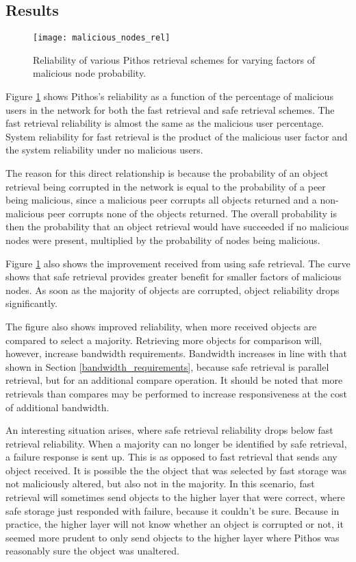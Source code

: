 \subsection{Results}
\begin{figure}[htbp]
 \centering
 \texttt{[image: malicious\_nodes\_rel]}
 \caption{Reliability of various Pithos retrieval schemes for varying factors of malicious node probability.}
 \label{fig_malicious_nodes_rel}
\end{figure}
%
Figure \ref{fig_malicious_nodes_rel} shows Pithos's reliability as a function of the percentage of malicious users in the network for both the fast retrieval and safe retrieval schemes. The fast retrieval reliability is almost the same as the malicious user percentage. System reliability for fast retrieval is the product of the malicious user factor and the system reliability under no malicious users.

The reason for this direct relationship is because the probability of an object retrieval being corrupted in the network is equal to the probability of a peer being malicious, since a malicious peer corrupts all objects returned and a non-malicious peer corrupts none of the objects returned. The overall probability is then the probability that an object retrieval would have succeeded if no malicious nodes were present, multiplied by the probability of nodes being malicious.

Figure \ref{fig_malicious_nodes_rel} also shows the improvement received from using safe retrieval. The curve shows that safe retrieval provides greater benefit for smaller factors of malicious nodes. As soon as the majority of objects are corrupted, object reliability drops significantly.

The figure also shows improved reliability, when more received objects are compared to select a majority. Retrieving more objects for comparison will, however, increase bandwidth requirements. Bandwidth increases in line with that shown in Section \ref{bandwidth_requirements}, because safe retrieval is parallel retrieval, but for an additional compare operation. It should be noted that more retrievals than compares may be performed to increase responsiveness at the cost of additional bandwidth.

An interesting situation arises, where safe retrieval reliability drops below fast retrieval reliability. When a majority can no longer be identified by safe retrieval, a failure response is sent up. This is as opposed to fast retrieval that sends any object received. It is possible the the object that was selected by fast storage was not maliciously altered, but also not in the majority. In this scenario, fast retrieval will sometimes send objects to the higher layer that were correct, where safe storage just responded with failure, because it couldn't be sure. Because in practice, the higher layer will not know whether an object is corrupted or not, it seemed more prudent to only send objects to the higher layer where Pithos was reasonably sure the object was unaltered.

